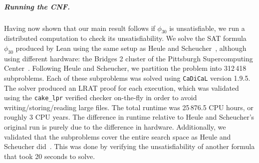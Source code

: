 \subparagraph*{Running the CNF.}
Having now shown that our main result follows if $\phi_{30}$ is unsatisfiable,
we run a distributed computation to check its unsatisfiability.
We solve the SAT formula~$\phi_{30}$ produced by Lean using the same setup as
Heule and Scheucher~\cite{emptyHexagonNumber}, although using different hardware:
the Bridges 2 cluster of the Pittsburgh Supercomputing Center~\cite{cluster}.
Following Heule and Scheucher,
we partition the problem into 312\,418 subproblems.
Each of these subproblems was
solved using {\tt CaDiCaL} version 1.9.5.
The solver produced an LRAT proof for each execution,
which was validated using the {\tt cake\_lpr} verified checker on-the-fly
in order to avoid writing/storing/reading large files.
The total runtime was 25\,876.5 CPU hours, or roughly 3 CPU years.
The difference in runtime relative to Heule and Scheucher's original run
is purely due to the difference in hardware.
Additionally,
we validated that the subproblems cover the entire search space as Heule and Scheucher did~\cite[Section 7.3]{emptyHexagonNumber}.
This was done by verifying the unsatisfiability
of another formula that took 20 seconds to solve.


